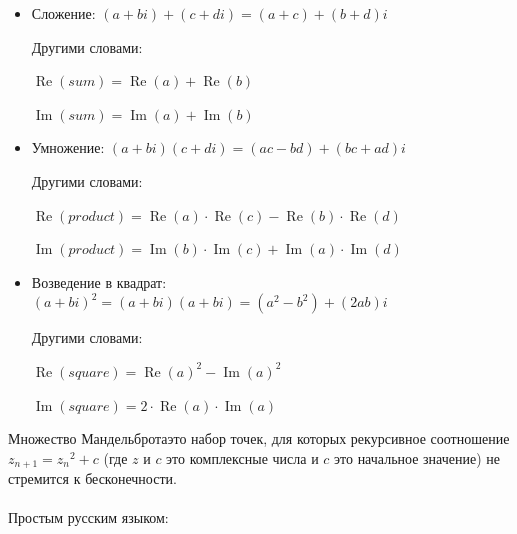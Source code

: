 \begin{itemize}
\item Сложение: $(a+bi) + (c+di) = (a+c) + (b+d)i$

Другими словами:

$\operatorname{Re}(sum) = \operatorname{Re}(a) + \operatorname{Re}(b)$

$\operatorname{Im}(sum) = \operatorname{Im}(a) + \operatorname{Im}(b)$

\item Умножение: $(a+bi) (c+di) = (ac-bd) + (bc+ad)i$

Другими словами:

$\operatorname{Re}(product) = \operatorname{Re}(a) \cdot \operatorname{Re}(c) - \operatorname{Re}(b) \cdot \operatorname{Re}(d)$

$\operatorname{Im}(product) = \operatorname{Im}(b) \cdot \operatorname{Im}(c) + \operatorname{Im}(a) \cdot \operatorname{Im}(d)$

\item Возведение в квадрат: $(a+bi)^2 = (a+bi) (a+bi) = (a^2-b^2) + (2ab)i$

Другими словами:

$\operatorname{Re}(square) = \operatorname{Re}(a)^2-\operatorname{Im}(a)^2$

$\operatorname{Im}(square) = 2 \cdot \operatorname{Re}(a) \cdot \operatorname{Im}(a)$

\end{itemize}


Множество Мандельброта\EMDASH{}это набор точек, для которых рекурсивное соотношение
 $z_{n+1} = {z_n}^2 + c$ 
(где $z$ и $c$ это комплексные числа и $c$ это начальное значение) не стремится к бесконечности.\\
\\
Простым русским языком: 


